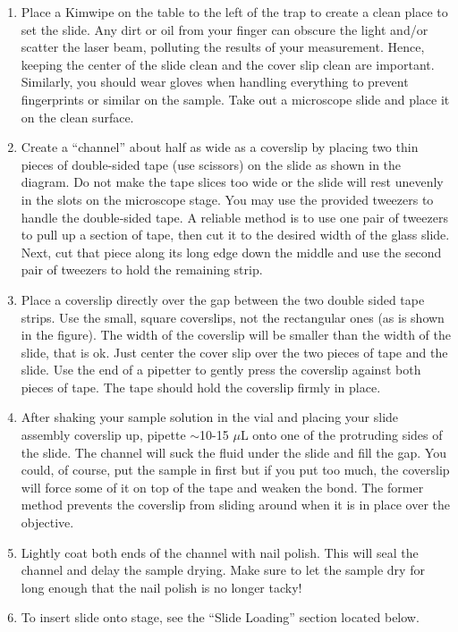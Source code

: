 \documentclass{../lab}
\begin{document}
\begin{enumerate}
    \item Place a Kimwipe on the table to the left of the trap to create a clean place to set the slide. Any dirt or oil from your finger can obscure the light and/or scatter the laser beam, polluting the results of your measurement. Hence, keeping the center of the slide clean and the cover slip clean are important. Similarly, you should wear gloves when handling everything to prevent fingerprints or similar on the sample. Take out a microscope slide and place it on the clean surface.

    \item Create a ``channel'' about half as wide as a coverslip by placing two thin pieces of double-sided tape (use scissors) on the slide as shown in the diagram. Do not make the tape slices too wide or the slide will rest unevenly in the slots on the microscope stage. You may use the provided tweezers to handle the double‑sided tape. A reliable method is to use one pair of tweezers to pull up a section of tape, then cut it to the desired width of the glass slide. Next, cut that piece along its long edge down the middle and use the second pair of tweezers to hold the remaining strip.

    \item Place a coverslip directly over the gap between the two double sided tape strips. Use the small, square coverslips, not the rectangular ones (as is shown in the figure). The width of the coverslip will be smaller than the width of the slide, that is ok. Just center the cover slip over the two pieces of tape and the slide. Use the end of a pipetter to gently press the coverslip against both pieces of tape. The tape should hold the coverslip firmly in place.

    \item After shaking your sample solution in the vial and placing your slide assembly coverslip up, pipette $\sim$10-15 $\mu$L onto one of the protruding sides of the slide. The channel will suck the fluid under the slide and fill the gap. You could, of course, put the sample in first but if you put too much, the coverslip will force some of it on top of the tape and weaken the bond. The former method prevents the coverslip from sliding around when it is in place over the objective.

    \item Lightly coat both ends of the channel with nail polish. This will seal the channel and delay the sample drying. Make sure to let the sample dry for long enough that the nail polish is no longer tacky!

    \item To insert slide onto stage, see the ``Slide Loading'' section located below.
\end{enumerate}
\end{document}

